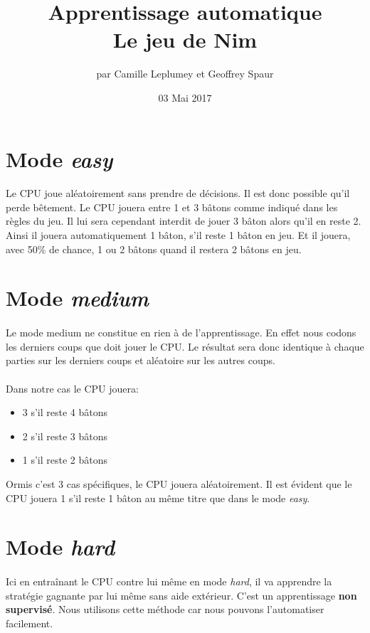 \documentclass{article}
\title{Apprentissage automatique \\ Le jeu de Nim}
\author{par Camille Leplumey et Geoffrey Spaur}
\date{03 Mai 2017}
\begin{document}
\maketitle
\newpage
\tableofcontents{}
\newpage
\section{Mode \emph{easy}}
  \paragraph{}
    Le CPU joue aléatoirement sans prendre de décisions. Il est donc possible qu'il perde bêtement. 
    Le CPU jouera entre 1 et 3 bâtons comme indiqué dans les règles du jeu.
    Il lui sera cependant interdit de jouer 3 bâton alors qu'il en reste 2. Ainsi il jouera automatiquement 1 bâton, s'il reste 1 bâton en jeu.
    Et il jouera, avec 50\% de chance, 1 ou 2 bâtons quand il restera 2 bâtons en jeu.
\section{Mode \emph{medium}}
  \paragraph{}
    Le mode medium ne constitue en rien à de l'apprentissage. En effet nous codons les derniers coups que doit
    jouer le CPU. Le résultat sera donc identique à chaque parties sur les derniers coups et aléatoire sur les autres coups.
  \paragraph{}
    Dans notre cas le CPU jouera:
    \begin{itemize}
     \item 3 s'il reste 4 bâtons
     \item 2 s'il reste 3 bâtons
     \item 1 s'il reste 2 bâtons
    \end{itemize}
    Ormis c'est 3 cas spécifiques, le CPU jouera aléatoirement. Il est évident que le CPU jouera 1 s'il reste 1 bâton au même titre que dans le mode \emph{easy}.
    
\newpage
\section{Mode \emph{hard}}
  \paragraph{}
    Ici en entraînant le CPU contre lui même en mode \emph{hard}, il va apprendre la stratégie gagnante par lui même sans aide extérieur. 
    C'est un apprentissage \textbf{non supervisé}. Nous utilisons cette méthode car nous pouvons l'automatiser facilement.
  
\end{document}

